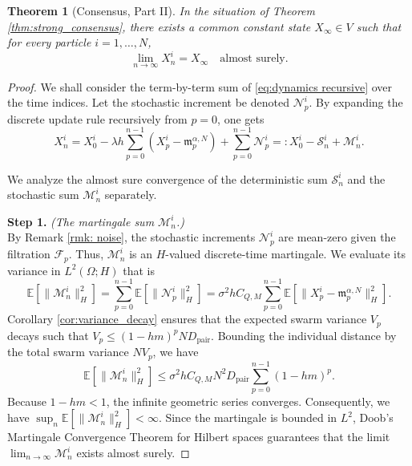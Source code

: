 \documentclass[12pt]{amsart}
\numberwithin{equation}{section}
\newtheorem{theorem}{Theorem}[section]
\begin{document}
\begin{theorem}[Consensus, Part II]\label{thm:common_state}
In the situation of Theorem \ref{thm:strong_consensus}, there exists a common constant state $X_\infty \in V$ such that for every particle $i = 1, \dots, N$,
\begin{equation}
    \lim_{n \to \infty} X_n^i = X_\infty \quad \text{almost surely.}
\end{equation}
\end{theorem}

\begin{proof}
We shall consider the term-by-term sum of \eqref{eq:dynamics recursive} over the time indices. 
Let the stochastic increment be denoted $\mathcal{N}_p^i$. By expanding the discrete update rule recursively from $p=0$, one gets
\begin{equation*}
    X_n^i = X_0^i - \lambda h \sum_{p=0}^{n-1} (X_p^i - \mathfrak{m}_p^{\alpha, N}) + \sum_{p=0}^{n-1} \mathcal{N}_p^i =: X_0^i - \mathcal{S}_n^i + \mathcal{M}_n^i.
\end{equation*}

We analyze the almost sure convergence of the deterministic sum $\mathcal{S}_n^i$ and the stochastic sum $\mathcal{M}_n^i$ separately.

\textbf{Step 1.} \textit{(The martingale sum $\mathcal{M}_n^i$.)} \\
By Remark \ref{rmk: noise}, the stochastic increments $\mathcal{N}_p^i$ are mean-zero given the filtration $\mathcal{F}_p$. Thus, $\mathcal{M}_n^i$ is an $H$-valued discrete-time martingale. We evaluate its variance in $L^2(\Omega; H)$ that is
\begin{equation*}
    \mathbb{E}[\|\mathcal{M}_n^i\|_H^2] = \sum_{p=0}^{n-1} \mathbb{E}[\|\mathcal{N}_p^i\|_H^2] = \sigma^2 h C_{Q,M} \sum_{p=0}^{n-1} \mathbb{E}[\|X_p^i - \mathfrak{m}_p^{\alpha, N}\|_H^2].
\end{equation*}
Corollary \ref{cor:variance_decay} ensures that the expected swarm variance $V_p$ decays such that $V_p \le (1-hm)^p ND_{\text{pair}}$. Bounding the individual distance by the total swarm variance $N V_p$, we have
\begin{equation*}
    \mathbb{E}[\|\mathcal{M}_n^i\|_H^2] \le \sigma^2 h C_{Q,M} N^2D_{\text{pair}} \sum_{p=0}^{n-1} (1-hm)^p.
\end{equation*}
Because $1-hm < 1$, the infinite geometric series converges. Consequently, we have $\sup_n \mathbb{E}[\|\mathcal{M}_n^i\|_H^2] < \infty$. Since the martingale is bounded in $L^2$, Doob's Martingale Convergence Theorem for Hilbert spaces \cite[Chapter IV, Theorem 3]{scalora1958abstract} guarantees that the limit $\lim_{n \to \infty} \mathcal{M}_n^i$ exists almost surely.


\end{proof}
\end{document}

